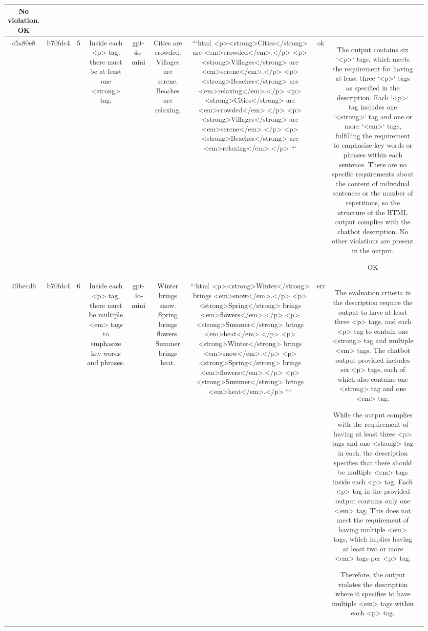 \begin{table}[h!]
\begin{tabular}{|c|c|c|c|c|c|c|c|c|c|}
No violation.
OK & \\
\hline
c5a80e8 & b70fdc4 & 5 & Inside each <p> tag, there must be at least one <strong> tag. & gpt-4o-mini & Cities are crowded. Villages are serene. Beaches are relaxing. & ```html
<p><strong>Cities</strong> are <em>crowded</em>.</p>
<p><strong>Villages</strong> are <em>serene</em>.</p>
<p><strong>Beaches</strong> are <em>relaxing</em>.</p>
<p><strong>Cities</strong> are <em>crowded</em>.</p>
<p><strong>Villages</strong> are <em>serene</em>.</p>
<p><strong>Beaches</strong> are <em>relaxing</em>.</p>
``` & ok & The output contains six `<p>` tags, which meets the requirement for having at least three `<p>` tags as specified in the description. Each `<p>` tag includes one `<strong>` tag and one or more `<em>` tags, fulfilling the requirement to emphasize key words or phrases within each sentence. There are no specific requirements about the content of individual sentences or the number of repetitions, so the structure of the HTML output complies with the chatbot description. No other violations are present in the output.

OK & \\
\hline
49becd6 & b70fdc4 & 6 & Inside each <p> tag, there must be multiple <em> tags to emphasize key words and phrases. & gpt-4o-mini & Winter brings snow. Spring brings flowers. Summer brings heat. & ```html
<p><strong>Winter</strong> brings <em>snow</em>.</p>
<p><strong>Spring</strong> brings <em>flowers</em>.</p>
<p><strong>Summer</strong> brings <em>heat</em>.</p>
<p><strong>Winter</strong> brings <em>snow</em>.</p>
<p><strong>Spring</strong> brings <em>flowers</em>.</p>
<p><strong>Summer</strong> brings <em>heat</em>.</p>
``` & err & The evaluation criteria in the description require the output to have at least three <p> tags, and each <p> tag to contain one <strong> tag and multiple <em> tags. The chatbot output provided includes six <p> tags, each of which also contains one <strong> tag and one <em> tag. 

While the output complies with the requirement of having at least three <p> tags and one <strong> tag in each, the description specifies that there should be multiple <em> tags inside each <p> tag. Each <p> tag in the provided output contains only one <em> tag. This does not meet the requirement of having multiple <em> tags, which implies having at least two or more <em> tags per <p> tag. 

Therefore, the output violates the description where it specifies to have multiple <em> tags within each <p> tag. 


\end{tabular}
\end{table}
